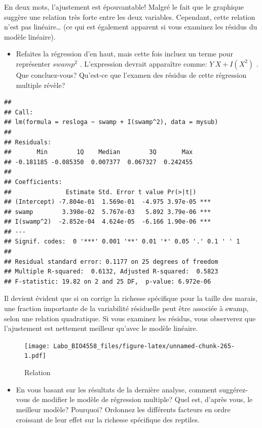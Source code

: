 \documentclass[12pt,]{book}
\providecommand{\tightlist}{%
  \setlength{\itemsep}{0pt}\setlength{\parskip}{0pt}}
\begin{document}
En deux mots, l'ajustement est épouvantable! Malgré le fait que le graphique suggère une relation très forte entre les deux variables. Cependant, cette relation n'est pas linéaire\ldots{} (ce qui est également apparent si vous examinez les résidus du modèle linéaire).

\begin{itemize}
\tightlist
\item
  Refaites la régression d'en haut, mais cette fois incluez un terme pour représenter \(swamp^2\) . L'expression devrait apparaître comme: \(Y ~ X + I(X^2)\) . Que concluez-vous? Qu'est-ce que l'examen des résidus de cette régression multiple révèle?
\end{itemize}

\begin{verbatim}
## 
## Call:
## lm(formula = resloga ~ swamp + I(swamp^2), data = mysub)
## 
## Residuals:
##       Min        1Q    Median        3Q       Max 
## -0.181185 -0.085350  0.007377  0.067327  0.242455 
## 
## Coefficients:
##               Estimate Std. Error t value Pr(>|t|)    
## (Intercept) -7.804e-01  1.569e-01  -4.975 3.97e-05 ***
## swamp        3.398e-02  5.767e-03   5.892 3.79e-06 ***
## I(swamp^2)  -2.852e-04  4.624e-05  -6.166 1.90e-06 ***
## ---
## Signif. codes:  0 '***' 0.001 '**' 0.01 '*' 0.05 '.' 0.1 ' ' 1
## 
## Residual standard error: 0.1177 on 25 degrees of freedom
## Multiple R-squared:  0.6132, Adjusted R-squared:  0.5823 
## F-statistic: 19.82 on 2 and 25 DF,  p-value: 6.972e-06
\end{verbatim}

Il devient évident que si on corrige la richesse spécifique pour la taille des marais, une fraction importante de la variabilité résiduelle peut être associée à swamp, selon une relation quadratique. Si vous examinez les résidus, vous observerez que l'ajustement est nettement meilleur qu'avec le modèle linéaire.

\begin{figure}
\centering
\texttt{[image: Labo\_BIO4558\_files/figure-latex/unnamed-chunk-265-1.pdf]}
\caption{\label{fig:unnamed-chunk-265}Relation}
\end{figure}

\begin{itemize}
\tightlist
\item
  En vous basant sur les résultats de la dernière analyse, comment suggérez-vous de modifier le modèle de régression multiple? Quel est, d'après vous, le meilleur modèle? Pourquoi? Ordonnez les différents facteurs en ordre croissant de leur effet sur la richesse spécifique des reptiles.
\end{itemize}
\end{document}
